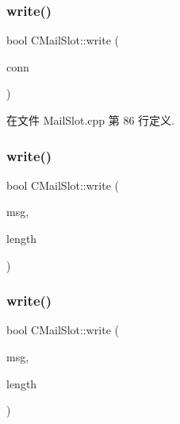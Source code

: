 \mbox{\label{class_c_mail_slot_a5eb6d0ece129a9c023cd058f45653427}} 
\subsubsection{\texorpdfstring{write()}{write()}\hspace{0.1cm}{\footnotesize\ttfamily [2/4]}}
{\footnotesize\ttfamily bool C\+Mail\+Slot\+::write (\begin{DoxyParamCaption}\item[{const \hyperlink{class_c_net_conn}{C\+Net\+Conn} \&}]{conn }\end{DoxyParamCaption})}



在文件 Mail\+Slot.\+cpp 第 86 行定义.

\mbox{\label{class_c_mail_slot_add3c2a84d9d2e588f23e009c08c0ca2d}} 
\subsubsection{\texorpdfstring{write()}{write()}\hspace{0.1cm}{\footnotesize\ttfamily [3/4]}}
{\footnotesize\ttfamily bool C\+Mail\+Slot\+::write (\begin{DoxyParamCaption}\item[{const char $\ast$}]{msg,  }\item[{const int}]{length }\end{DoxyParamCaption})}

\mbox{\label{class_c_mail_slot_add3c2a84d9d2e588f23e009c08c0ca2d}} 
\subsubsection{\texorpdfstring{write()}{write()}\hspace{0.1cm}{\footnotesize\ttfamily [4/4]}}
{\footnotesize\ttfamily bool C\+Mail\+Slot\+::write (\begin{DoxyParamCaption}\item[{const char $\ast$}]{msg,  }\item[{const int}]{length }\end{DoxyParamCaption})}



